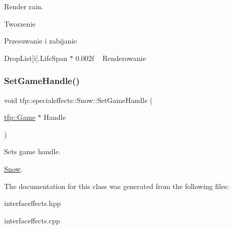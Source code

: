 Render rain. 

Tworzenie

Przesuwanie i zabijanie

Drop\+List\mbox{[}i\mbox{]}.Life\+Span $\ast$ 0.\+002f ~\newline
 Renderowanie \mbox{\label{classtfp_1_1specialeffects_1_1_snow_a5063a8aeb0d896d8755ae1f9c803252d}} 
\subsubsection{\texorpdfstring{Set\+Game\+Handle()}{SetGameHandle()}}
{\footnotesize\ttfamily void tfp\+::specialeffects\+::\+Snow\+::\+Set\+Game\+Handle (\begin{DoxyParamCaption}\item[{\mbox{\hyperlink{classtfp_1_1_game}{tfp\+::\+Game}} $\ast$}]{Handle }\end{DoxyParamCaption})}



Sets game handle. 

\mbox{\hyperlink{classtfp_1_1specialeffects_1_1_snow}{Snow}}. 

The documentation for this class was generated from the following files\+:\begin{DoxyCompactItemize}
\item 
interfaceffects.\+hpp\item 
interfaceffects.\+cpp\end{DoxyCompactItemize}
